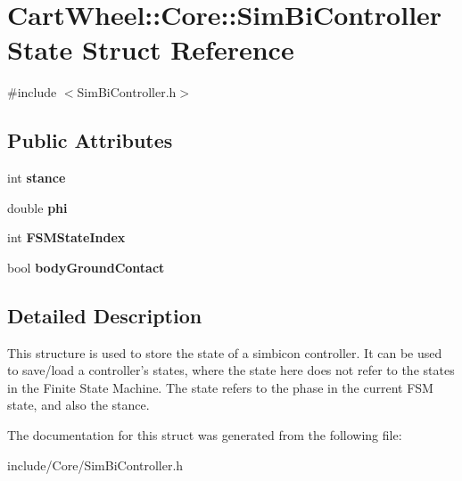 \hypertarget{structCartWheel_1_1Core_1_1SimBiControllerState}{
\section{CartWheel::Core::SimBiControllerState Struct Reference}
\label{structCartWheel_1_1Core_1_1SimBiControllerState}
}


{\ttfamily \#include $<$SimBiController.h$>$}

\subsection*{Public Attributes}
\begin{DoxyCompactItemize}
\item 
\hypertarget{structCartWheel_1_1Core_1_1SimBiControllerState_a2cc4f8947066b5c969a026a8e1c335cb}{
int {\bfseries stance}}
\label{structCartWheel_1_1Core_1_1SimBiControllerState_a2cc4f8947066b5c969a026a8e1c335cb}

\item 
\hypertarget{structCartWheel_1_1Core_1_1SimBiControllerState_a95a87fa3fc717dfc324c83ddaf3b9447}{
double {\bfseries phi}}
\label{structCartWheel_1_1Core_1_1SimBiControllerState_a95a87fa3fc717dfc324c83ddaf3b9447}

\item 
\hypertarget{structCartWheel_1_1Core_1_1SimBiControllerState_a19511d18a545df2ef3be542c13aaff90}{
int {\bfseries FSMStateIndex}}
\label{structCartWheel_1_1Core_1_1SimBiControllerState_a19511d18a545df2ef3be542c13aaff90}

\item 
\hypertarget{structCartWheel_1_1Core_1_1SimBiControllerState_aeac7a3c7dadcea4c1e9f31b4ea876bdf}{
bool {\bfseries bodyGroundContact}}
\label{structCartWheel_1_1Core_1_1SimBiControllerState_aeac7a3c7dadcea4c1e9f31b4ea876bdf}

\end{DoxyCompactItemize}


\subsection{Detailed Description}
This structure is used to store the state of a simbicon controller. It can be used to save/load a controller's states, where the state here does not refer to the states in the Finite State Machine. The state refers to the phase in the current FSM state, and also the stance. 

The documentation for this struct was generated from the following file:\begin{DoxyCompactItemize}
\item 
include/Core/SimBiController.h\end{DoxyCompactItemize}
